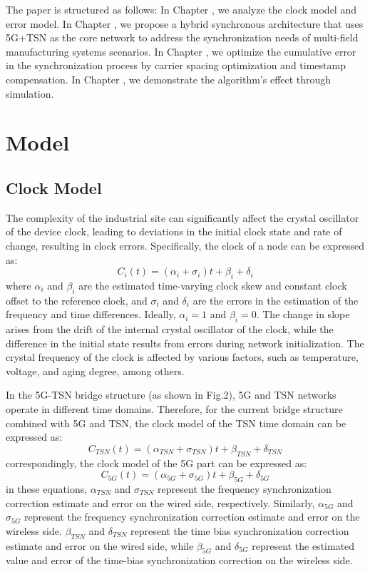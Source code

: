 \documentclass[english]{cccconf}
\begin{document}
The paper is structured as follows: In Chapter \uppercase\expandafter{}, we analyze the clock model and error model. In Chapter \uppercase\expandafter{}, we propose a hybrid synchronous architecture that uses 5G+TSN as the core network to address the synchronization needs of multi-field manufacturing systems scenarios. In Chapter \uppercase\expandafter{}, we optimize the cumulative error in the synchronization process by carrier spacing optimization and timestamp compensation. In Chapter \uppercase\expandafter{}, we demonstrate the algorithm's effect through simulation.

\section{Model}

\subsection{Clock Model}
The complexity of the industrial site can significantly affect the crystal oscillator of the device clock, leading to deviations in the initial clock state and rate of change, resulting in clock errors. Specifically, the clock of a node can be expressed as:
\begin{equation}
	C_i(t) = (\alpha _i+\sigma_i)t + \beta _i +\delta_i
\end{equation}
where $\alpha_i$ and $\beta_i$ are the estimated time-varying clock skew and constant clock offset to the reference clock, and $\sigma_i$ and $\delta_i$ are the errors in the estimation of the frequency and time differences. Ideally, $\alpha_i = 1$ and $\beta_i = 0$. The change in slope arises from the drift of the internal crystal oscillator of the clock, while the difference in the initial state results from errors during network initialization. The crystal frequency of the clock is affected by various factors, such as temperature, voltage, and aging degree, among others.

In the 5G-TSN bridge structure (as shown in Fig.2), 5G and TSN networks operate in different time domains. Therefore, for the current bridge structure combined with 5G and TSN, the clock model of the TSN time domain can be expressed as:
\begin{equation}
	C_{TSN}(t) = (\alpha_{TSN}+\sigma_{TSN})t + \beta _{TSN} +\delta_{TSN}
\end{equation}
 correspondingly, the clock model of the 5G part can be expressed as:
 \begin{equation}
 	C_{5G}(t) = (\alpha_{5G}+\sigma_{5G})t + \beta _{5G} +\delta_{5G}
 \end{equation}
in these equations, $\alpha_{TSN}$ and $\sigma_{TSN}$ represent the frequency synchronization correction estimate and error on the wired side, respectively. Similarly, $\alpha_{5G}$ and $\sigma_{5G}$ represent the frequency synchronization correction estimate and error on the wireless side. $\beta_{TSN}$ and $\delta_{TSN}$ represent the time bias synchronization correction estimate and error on the wired side, while $\beta_{5G}$ and $\delta_{5G}$ represent the estimated value and error of the time-bias synchronization correction on the wireless side. 
\end{document}
